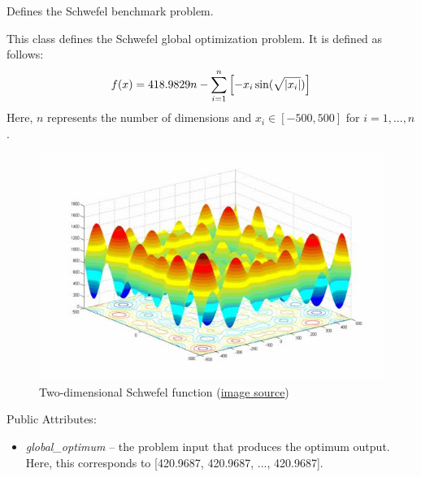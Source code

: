 \documentclass[letterpaper,10pt,english]{sphinxmanual}
\begin{document}

\begin{fulllineitems}
\label{reference:inspyred.benchmarks.Schwefel}
Defines the Schwefel benchmark problem.

This class defines the Schwefel global optimization problem. 
It is defined as follows:
\begin{gather}
\begin{split}f(x) = 418.9829n - \sum_{i=1}^n \left[-x_i \sin(\sqrt{|x_i|})\right]\end{split}\notag
\end{gather}
Here, $n$ represents the number of dimensions and $x_i \in [-500, 500]$ for $i=1,...,n$.
\begin{figure}[htbp]
\centering
\capstart

\includegraphics{image12721.jpg}
\caption{Two-dimensional Schwefel function 
(\href{http://www-optima.amp.i.kyoto-u.ac.jp/member/student/hedar/Hedar\_files/TestGO\_files/Page2530.htm}{image source})}\end{figure}

Public Attributes:
\begin{itemize}
\item {} 
\emph{global\_optimum} -- the problem input that produces the optimum output.
Here, this corresponds to {[}420.9687, 420.9687, ..., 420.9687{]}.

\end{itemize}

\end{fulllineitems}
\end{document}
